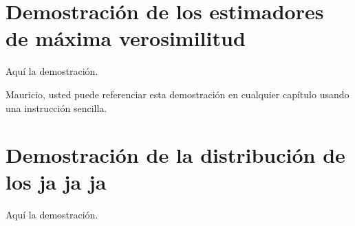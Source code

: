 \documentclass[10pt,]{krantz}
\begin{document}
\section{Demostración de los estimadores de máxima
verosimilitud}\label{demostracion-de-los-estimadores-de-maxima-verosimilitud}

Aquí la demostración.

Mauricio, usted puede referenciar esta demostración en cualquier
capítulo usando una instrucción sencilla.

\section{Demostración de la distribución de los ja ja
ja}\label{demostracion-de-la-distribucion-de-los-ja-ja-ja}

Aquí la demostración.



\backmatter
\printindex
\end{document}
